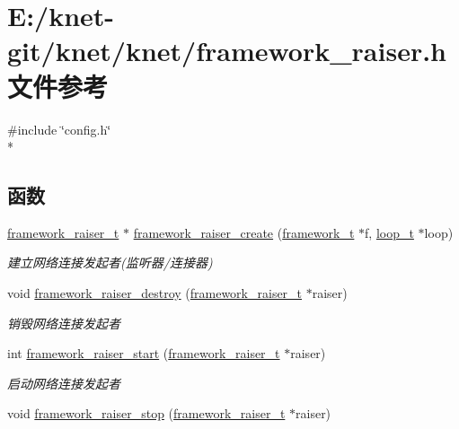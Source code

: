 \hypertarget{a00059}{}\section{E\+:/knet-\/git/knet/knet/framework\+\_\+raiser.h 文件参考}
\label{a00059}
{\ttfamily \#include \char`\"{}config.\+h\char`\"{}}\\*
\subsection*{函数}
\begin{DoxyCompactItemize}
\item 
\hyperlink{a00051_aa3ac31db191829c9e6db624d660a2563_aa3ac31db191829c9e6db624d660a2563}{framework\+\_\+raiser\+\_\+t} $\ast$ \hyperlink{a00059_a6a305a33afdea0d9b774d4b987aff05e_a6a305a33afdea0d9b774d4b987aff05e}{framework\+\_\+raiser\+\_\+create} (\hyperlink{a00051_a6149d769f6f07ed14a40a271c95d8463_a6149d769f6f07ed14a40a271c95d8463}{framework\+\_\+t} $\ast$f, \hyperlink{a00051_a9c3ad1cd2de83e09f3a7b59fa82c94ee_a9c3ad1cd2de83e09f3a7b59fa82c94ee}{loop\+\_\+t} $\ast$loop)
\begin{DoxyCompactList}\small\item\em 建立网络连接发起者(监听器/连接器) \end{DoxyCompactList}\item 
void \hyperlink{a00059_aeb1e0bff411b59cc3ec79da5ab23d2c1_aeb1e0bff411b59cc3ec79da5ab23d2c1}{framework\+\_\+raiser\+\_\+destroy} (\hyperlink{a00051_aa3ac31db191829c9e6db624d660a2563_aa3ac31db191829c9e6db624d660a2563}{framework\+\_\+raiser\+\_\+t} $\ast$raiser)
\begin{DoxyCompactList}\small\item\em 销毁网络连接发起者 \end{DoxyCompactList}\item 
int \hyperlink{a00059_a72206fc25182b20ead062464ed0b1139_a72206fc25182b20ead062464ed0b1139}{framework\+\_\+raiser\+\_\+start} (\hyperlink{a00051_aa3ac31db191829c9e6db624d660a2563_aa3ac31db191829c9e6db624d660a2563}{framework\+\_\+raiser\+\_\+t} $\ast$raiser)
\begin{DoxyCompactList}\small\item\em 启动网络连接发起者 \end{DoxyCompactList}\item 
void \hyperlink{a00059_a28061890dd7d07a16df39417ada87107_a28061890dd7d07a16df39417ada87107}{framework\+\_\+raiser\+\_\+stop} (\hyperlink{a00051_aa3ac31db191829c9e6db624d660a2563_aa3ac31db191829c9e6db624d660a2563}{framework\+\_\+raiser\+\_\+t} $\ast$raiser)

\end{DoxyCompactItemize}
